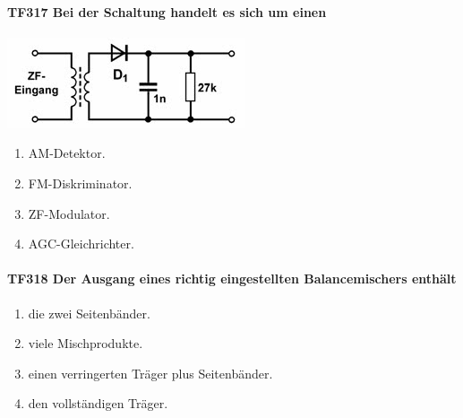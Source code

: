 \documentclass[8pt]{article}
\begin{document}
\paragraph*{TF317 Bei der Schaltung handelt es sich um einen}
\begin{center}
	\begin{minipage}{\linewidth}
		\centering
		\includegraphics[scale=1.0]{pics/tf317_a.jpg}
	\end{minipage}
\end{center}
\begin{enumerate}[nolistsep,label=\Alph*]
\item AM-Detektor.
\item FM-Diskriminator.
\item ZF-Modulator.
\item AGC-Gleichrichter.
\end{enumerate}

\paragraph*{TF318 Der Ausgang eines richtig eingestellten Balancemischers enthält}
\begin{enumerate}[nolistsep,label=\Alph*]
\item die zwei Seitenbänder.
\item viele Mischprodukte.
\item einen verringerten Träger plus Seitenbänder.
\item den vollständigen Träger.
\end{enumerate}
\end{document}
